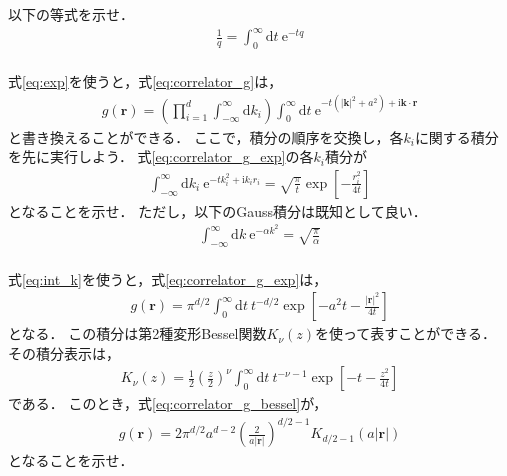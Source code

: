 \documentclass[a4paper,12pt]{jsarticle}
\begin{document}
以下の等式を示せ．
\begin{align}
\label{eq:exp}
    \frac{1}{q}
    =
    \int^{\infty}_{0}\mathrm{d}t~\mathrm{e}^{-tq}
\end{align}
\\

式\eqref{eq:exp}を使うと，式\eqref{eq:correlator_g}は，
\begin{align}
\label{eq:correlator_g_exp}
    g(\bm{r})
    =
    \left(\prod_{i=1}^{d}\int^{\infty}_{-\infty}\mathrm{d}k_{i}\right)
    \int^{\infty}_{0}\mathrm{d}t
    ~\mathrm{e}^{-t\left(|\bm{k}|^{2}+a^{2}\right)+\mathrm{i}\bm{k}\cdot\bm{r}}
\end{align}
と書き換えることができる．
ここで，積分の順序を交換し，各$k_{i}$に関する積分を先に実行しよう．
式\eqref{eq:correlator_g_exp}の各$k_{i}$積分が
\begin{align}
\label{eq:int_k}
    \int^{\infty}_{-\infty}\mathrm{d}k_{i}
    ~\mathrm{e}^{-tk_{i}^{2}+\mathrm{i}k_{i}r_{i}}
    =
    \sqrt{\frac{\pi}{t}}
    \exp\left[
        -\frac{r_{i}^{2}}{4t}
    \right]
\end{align}
となることを示せ．
ただし，以下のGauss積分は既知として良い．
\begin{align}
    \int^{\infty}_{-\infty}\mathrm{d}k
    ~\mathrm{e}^{-\alpha k^{2}}
    =
    \sqrt{\frac{\pi}{\alpha}}
\end{align}
\\

式\eqref{eq:int_k}を使うと，式\eqref{eq:correlator_g_exp}は，
\begin{align}
\label{eq:correlator_g_bessel}
    g(\bm{r})
    =
    \pi^{d/2}
    \int^{\infty}_{0}\mathrm{d}t
    ~t^{-d/2}
    \exp\left[
        -a^{2}t-\frac{|\bm{r}|^{2}}{4t}
    \right]
\end{align}
となる．
この積分は第2種変形Bessel関数$K_{\nu}(z)$を使って表すことができる．
その積分表示は，
\begin{align}
    K_{\nu}(z)
    =
    \frac{1}{2}\left(\frac{z}{2}\right)^{\nu}
    \int^{\infty}_{0}\mathrm{d}t
    ~t^{-\nu-1}
    \exp\left[
        -t-\frac{z^{2}}{4t}
    \right]
\end{align}
である．
このとき，式\eqref{eq:correlator_g_bessel}が，
\begin{align}
    g(\bm{r})
    =
    2\pi^{d/2}a^{d-2}\left(\frac{2}{a|\bm{r}|}\right)^{d/2-1}
    K_{d/2-1}(a|\bm{r}|)
\end{align}
となることを示せ．
\\
\end{document}
